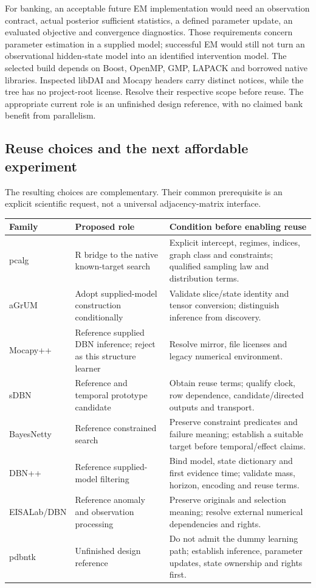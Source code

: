 For banking, an acceptable future EM implementation would need an observation
contract, actual posterior sufficient statistics, a defined parameter update,
an evaluated objective and convergence diagnostics. Those requirements concern
parameter estimation in a supplied model; successful EM would still not turn
an observational hidden-state model into an identified intervention model.
The selected build depends on Boost, OpenMP, GMP, LAPACK and borrowed native
libraries. Inspected libDAI and Mocapy headers carry distinct notices, while
the tree has no project-root license. Resolve their respective scope before
reuse. The appropriate current role is an unfinished design reference, with
no claimed bank benefit from parallelism. \citep{rel19pdbntk}

\subsection{Reuse choices and the next affordable experiment}

The resulting choices are complementary. Their common prerequisite is an
explicit scientific request, not a universal adjacency-matrix interface.

\begin{longtable}{P{0.15\textwidth}P{0.34\textwidth}P{0.43\textwidth}}
\toprule
Family & Proposed role & Condition before enabling reuse\\
\midrule
\endhead
pcalg & R bridge to the native known-target search & Explicit intercept, regimes,
indices, graph class and constraints; qualified sampling law and distribution terms.\\
aGrUM & Adopt supplied-model construction conditionally & Validate slice/state
identity and tensor conversion; distinguish inference from discovery.\\
Mocapy++ & Reference supplied DBN inference; reject as this structure learner &
Resolve mirror, file licenses and legacy numerical environment.\\
sDBN & Reference and temporal prototype candidate & Obtain reuse terms; qualify
clock, row dependence, candidate/directed outputs and transport.\\
BayesNetty & Reference constrained search & Preserve constraint predicates and
failure meaning; establish a suitable target before temporal/effect claims.\\
DBN++ & Reference supplied-model filtering & Bind model, state dictionary and first evidence time; validate mass, horizon, encoding and reuse terms.\\
EISALab/\allowbreak DBN & Reference anomaly and observation processing & Preserve originals and selection meaning; resolve external numerical dependencies and rights.\\
pdbntk & Unfinished design reference & Do not admit the dummy learning path; establish inference, parameter updates, state ownership and rights first.\\
\bottomrule
\end{longtable}

